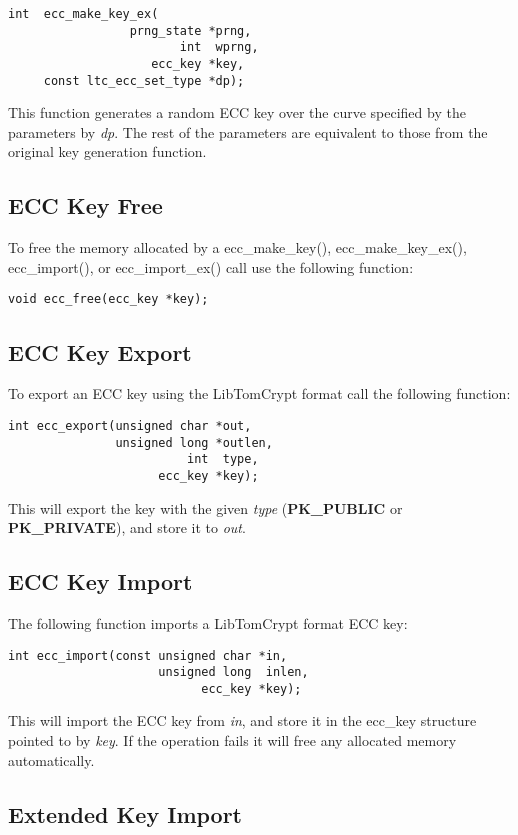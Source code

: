 \documentclass[synpaper]{book}
\begin{document}
\begin{verbatim}
int  ecc_make_key_ex(
                 prng_state *prng, 
                        int  wprng, 
                    ecc_key *key, 
     const ltc_ecc_set_type *dp);
\end{verbatim}

This function generates a random ECC key over the curve specified by the parameters by \textit{dp}.  The rest of the parameters are equivalent to
those from the original key generation function.

\subsection{ECC Key Free}
To free the memory allocated by a ecc\_make\_key(), ecc\_make\_key\_ex(), ecc\_import(), or ecc\_import\_ex() call use the following function:
\begin{verbatim}
void ecc_free(ecc_key *key);
\end{verbatim}

\subsection{ECC Key Export}
To export an ECC key using the LibTomCrypt format call the following function:
\begin{verbatim}
int ecc_export(unsigned char *out, 
               unsigned long *outlen, 
                         int  type, 
                     ecc_key *key);
\end{verbatim}
This will export the key with the given \textit{type} (\textbf{PK\_PUBLIC} or \textbf{PK\_PRIVATE}), and store it to \textit{out}.  

\subsection{ECC Key Import}
The following function imports a LibTomCrypt format ECC key:
\begin{verbatim}
int ecc_import(const unsigned char *in, 
                     unsigned long  inlen, 
                           ecc_key *key);
\end{verbatim}
This will import the ECC key from \textit{in}, and store it in the ecc\_key structure pointed to by \textit{key}.  If the operation fails it will free
any allocated memory automatically.

\subsection{Extended Key Import}
\end{document}

